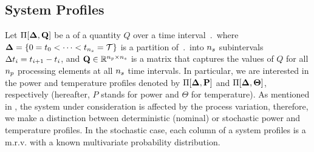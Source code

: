 \subsection{System Profiles} 
Let $\prof{\m{Q}}$ be a  of a quantity $Q$ over a time interval $\period$ where $\boldsymbol{\Delta} = \{ 0 = t_0 < \dots < t_{{n_s}} = \mathcal{T} \}$ is a partition of $\period$ into ${n_s}$ subintervals $\Delta t_i = t_{i+1} - t_i$, and $\m{Q} \in \real^{\cores \times \steps}$ is a matrix that captures the values of $Q$ for all ${n_p}$ processing elements at all ${n_s}$ time intervals. In particular, we are interested in the power and temperature profiles denoted by $\prof{\mP}$ and $\Pi[\boldsymbol{\Delta}, {\boldsymbol\Theta}]$, respectively (hereafter, $P$ stands for power and $\Theta$ for temperature). As mentioned in , the system under consideration is affected by the process variation, therefore, we make a distinction between deterministic (nominal) or stochastic power and temperature profiles. In the stochastic case, each column of a system profiles is a m.r.v. with a known multivariate probability distribution.
